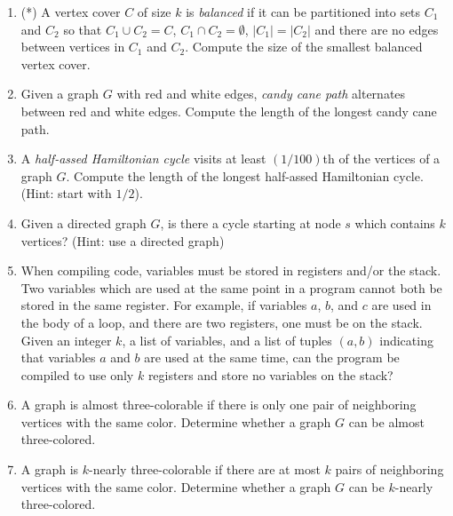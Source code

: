 \documentclass[fleqn]{article}
\begin{document}
\begin{enumerate}
    \item (*) A vertex cover $C$ of size $k$ is \textit{balanced} if it can be partitioned into sets $C_1$ and $C_2$ so that $C_1 \cup C_2 = C$, $C_1 \cap C_2 = \emptyset$, $|C_1| = |C_2|$ and there are no edges between vertices in $C_1$ and $C_2$. Compute the size of the smallest balanced vertex cover.
    \item Given a graph $G$ with red and white edges, \textit{candy cane path} alternates between red and white edges. Compute the length of the longest candy cane path.
    \item A \textit{half-assed Hamiltonian cycle} visits at least $(1/100)$th of the vertices of a graph $G$. Compute the length of the longest half-assed Hamiltonian cycle. (Hint: start with $1/2$).
    \item Given a directed graph $G$, is there a cycle starting at node $s$ which contains $k$ vertices? (Hint: use a directed graph)
    \item When compiling code, variables must be stored in registers and/or the stack. Two variables which are used at the same point in a program cannot both be stored in the same register. For example, if variables $a$, $b$, and $c$ are used in the body of a loop, and there are two registers, one must be on the stack. Given an integer $k$, a list of variables, and a list of tuples $(a,b)$ indicating that variables $a$ and $b$ are used at the same time, can the program be compiled to use only $k$ registers and store no variables on the stack?
    \item A graph is almost three-colorable if there is only one pair of neighboring vertices with the same color. Determine whether a graph $G$ can be almost three-colored.
    \item A graph is $k$-nearly three-colorable if there are at most $k$ pairs of neighboring vertices with the same color. Determine whether a graph $G$ can be $k$-nearly three-colored.
\end{enumerate}
\end{document}
